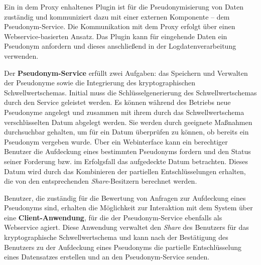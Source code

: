 Ein in dem Proxy enhaltenes Plugin ist für die Pseudonymisierung von Daten zuständig und kommuniziert dazu mit einer externen Komponente -- dem Pseudonym-Service. Die Kommunikation mit dem Proxy erfolgt über einen Webservice-basierten Ansatz. Das Plugin kann für eingehende Daten ein Pseudonym anfordern und dieses anschließend in der Logdatenverarbeitung verwenden.

Der \textbf{Pseudonym-Service} erfüllt zwei Aufgaben: das Speichern und Verwalten der Pseudonyme sowie die Integrierung des kryptographischen Schwellwertschemas. Initial muss die Schlüsselgenerierung des Schwellwertschemas durch den Service geleistet werden. 
Es können während des Betriebs neue Pseudonyme angelegt und zusammen mit ihrem durch das Schwellwertschema verschlüsselten Datum abgelegt werden. Sie werden durch geeignete Maßnahmen durchsuchbar gehalten, um für ein Datum überprüfen zu können, ob bereits ein Pseudonym vergeben wurde. 
Über ein Webinterface kann ein berechtiger Benutzer die Aufdeckung eines bestimmten Pseudonyms fordern und den Status seiner Forderung bzw. im Erfolgsfall das aufgedeckte Datum betrachten. Dieses Datum wird durch das Kombinieren der partiellen Entschlüsselungen erhalten, die von den entsprechenden \textit{Share}-Besitzern berechnet werden.

Benutzer, die zuständig für die Bewertung von Anfragen zur Aufdeckung eines Pseudonyms sind, erhalten die Möglichkeit zur Interaktion mit dem System über eine \textbf{Client-Anwendung}, für die der Pseudonym-Service ebenfalls als Webservice agiert. Diese Anwendung verwaltet den \textit{Share} des Benutzers für das kryptographische Schwellwertschema und kann nach der Bestätigung des Benutzers zu der Aufdeckung eines Pseudonyms die partielle Entschlüsselung eines Datensatzes erstellen und an den Pseudonym-Service senden.
